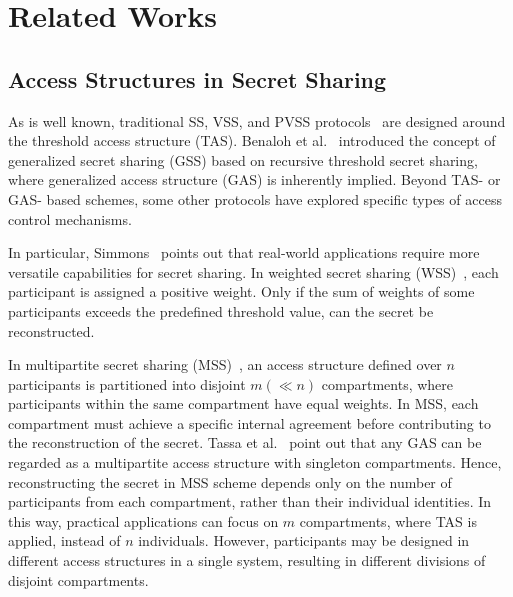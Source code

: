 \documentclass[runningheads]{llncs}
\begin{document}
\section{Related Works}
\label{sec:related_works}


\subsection{Access Structures in Secret Sharing}

As is well known, traditional SS, VSS, and PVSS  protocols~\cite{Shamir79SS,Feldman1987VSS,Stadler1996PVSS,Cascudo2017PVSS,cascudo2024publicly} are designed around the threshold access structure (TAS).
Benaloh et al.~\cite{benaloh1990generalized} introduced the concept of generalized secret sharing (GSS) based on recursive threshold secret sharing, where generalized access structure (GAS) is inherently implied. Beyond  TAS- or GAS- based schemes, some other protocols have explored specific types of access control mechanisms.


In particular, Simmons~\cite{Simmons1988SS} points out that real-world applications require more versatile capabilities for secret sharing.
In weighted secret sharing (WSS)~\cite{beimel2005characterizing,Garg2023MPC}, each participant is assigned a positive weight. Only if the sum of weights of some participants exceeds the predefined threshold value, can the secret be reconstructed.



In multipartite secret sharing (MSS)~\cite{Chen2021MSS,tassa2009multipartite}, an access structure defined over $n$ participants is partitioned into disjoint $m(\ll n)$ compartments, where participants within the same compartment have equal weights. In MSS, each compartment must achieve a specific internal agreement before contributing to the reconstruction of the secret.
Tassa et al.~\cite{tassa2009multipartite} point out that any GAS can be regarded as a multipartite access structure with singleton compartments. Hence, reconstructing the secret in MSS scheme depends only on the number of participants from each compartment, rather than their individual identities. In this way, practical applications can focus on $m$ compartments, where TAS is applied, instead of $n$ individuals. However, participants may be designed in different access structures in a single system, resulting in different divisions of disjoint compartments.
\end{document}
